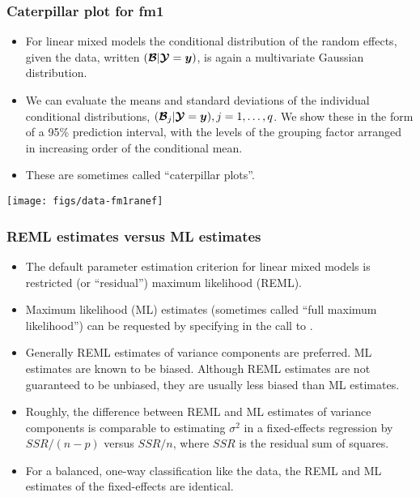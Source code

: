 \begin{frame}[fragile]
  \frametitle{Caterpillar plot for fm1}
  \begin{itemize}
  \item For linear mixed models the conditional distribution of the
    random effects, given the data, written $(\bm{\mathcal{B}}|\bm{\mathcal{Y}}=\bm y)$, is
    again a multivariate Gaussian distribution.
  \item We can evaluate the means and standard deviations of the
    individual conditional distributions, $(\bm{\mathcal{B}}_j|\bm{\mathcal{Y}}=\bm y), j =
    1,\dots,q$.  We show these in the form of a 95\% prediction
    interval, with the levels of the grouping factor arranged in
    increasing order of the conditional mean.
  \item These are sometimes called ``caterpillar plots''.
  \end{itemize}
  \begin{center}
\texttt{[image: figs/data-fm1ranef]}
  \end{center}
\end{frame}

\begin{frame}
  \frametitle{REML estimates versus ML estimates}
  \begin{itemize}
  \item The default parameter estimation criterion for linear mixed
    models is restricted (or ``residual'') maximum likelihood (REML).
  \item Maximum likelihood (ML) estimates (sometimes called ``full
    maximum likelihood'') can be requested by specifying  in the call to .
  \item Generally REML estimates of variance components are
    preferred.  ML estimates are known to be biased.  Although REML
    estimates are not guaranteed to be unbiased, they are usually less
    biased than ML estimates.
  \item Roughly, the difference between REML and ML estimates of
    variance components is comparable to estimating $\sigma^2$ in a
    fixed-effects regression by $\mathit{SSR}/(n-p)$ versus
    $\mathit{SSR}/n$, where $\mathit{SSR}$ is the residual sum of
    squares.
  \item For a balanced, one-way classification like the
     data, the REML and ML estimates of the fixed-effects
    are identical.
  \end{itemize}
\end{frame}

